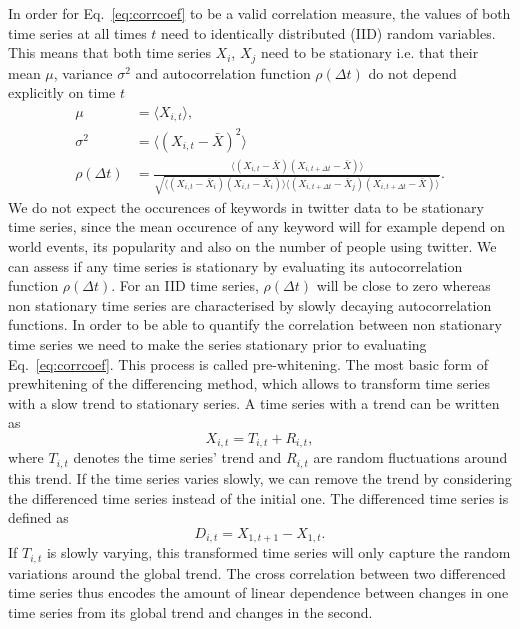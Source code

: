 \documentclass[12pt, a4paper]{article}
\begin{document}
In order for Eq.~\ref{eq:corrcoef} to be a valid correlation measure, the values of both time series at all times $t$ need to identically distributed (IID) random variables. This means that both time series $X_{i}$, $X_{j}$ need to be stationary i.e. that their mean $\mu$, variance $\sigma^{2}$ and autocorrelation function $\rho(\Delta t)$ do not depend explicitly on time $t$
\begin{align}
\mu &= \langle X_{i, t} \rangle, \\
\sigma^{2} &=  \langle (X_{i, t}-\bar{X})^{2} \rangle \\
\rho(\Delta t) &= \frac{\langle (X_{i, t}-\bar{X}) (X_{i, t+\Delta t}-\bar{X}) \rangle}{\sqrt{\langle (X_{i, t}-\bar{X}_{i}) (X_{i, t}-\bar{X}_{i}) \rangle \langle (X_{i, t+\Delta t}-\bar{X}_{j}) (X_{i, t+\Delta t}-\bar{X}_{}) \rangle}}. 
\end{align} 
We do not expect the occurences of keywords in twitter data to be stationary time series, since the mean occurence of any keyword will for example depend on world events, its popularity and also on the number of people using twitter. We can assess if any time series is stationary by evaluating its autocorrelation function $\rho(\Delta t)$. For an IID time series, $\rho(\Delta t)$ will be close to zero whereas non stationary time series are characterised by slowly decaying autocorrelation functions.
In order to be able to quantify the correlation between non stationary time series we need to make the series stationary prior to evaluating Eq.~\ref{eq:corrcoef}. This process is called pre-whitening. The most basic form of prewhitening of the differencing method, which allows to transform time series with a slow trend to stationary series. A time series with a trend can be written as
\begin{equation}
X_{i, t} = T_{i, t} + R_{i, t},
\end{equation} 
where $T_{i, t}$ denotes the time series' trend and $R_{i, t}$ are random fluctuations around this trend. If the time series varies slowly, we can remove the trend by considering the differenced time series instead of the initial one. The differenced time series is defined as
\begin{equation}
D_{i, t} = X_{1, t+1}- X_{1, t}.
\end{equation} 
If $T_{i, t}$ is slowly varying, this transformed time series will only capture the random variations around the global trend. The cross correlation between two differenced time series thus encodes the amount of linear dependence between changes in one time series from its global trend and changes in the second.
\end{document}
